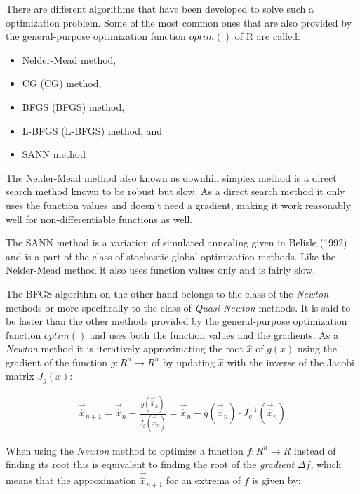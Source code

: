 There are different algorithms that have been developed to solve such a optimization problem. Some of the most common ones that are also provided by the general-purpose optimization function $optim()$  of R are called:\textsuperscript{\cite{TeamROptimization}}
\begin{itemize}
	\item Nelder-Mead method,
	\item \acl{CG} (\acs{CG}) method,
	\item \acl{BFGS} (\acs{BFGS}) method,
	\item \acl{L-BFGS} (\acs{L-BFGS}) method, and
	\item SANN method
\end{itemize}

The Nelder-Mead method also known as downhill simplex method is a direct search method known to be robust but slow. As a direct search method it only uses the function values and doesn't need a gradient, making it work reasonably well for non-differentiable functions as well.\textsuperscript{\cite{TeamROptimization}}

The SANN method is a variation of simulated annealing given in Belisle (1992)\textsuperscript{\cite{Belisle1992ConvergenceD}} and is a part of the class of stochastic global optimization methods. Like the Nelder-Mead method it also uses function values only and is fairly slow.\textsuperscript{\cite{TeamROptimization}}

The \acs{BFGS} algorithm on the other hand belongs to the class of the \textit{Newton} methods or more specifically to the class of \textit{Quasi-Newton} methods. It is said to be faster than the other methods provided by the general-purpose optimization function $optim()$ and uses both the function values and the gradients. As a \textit{Newton} method it is iteratively approximating the root $\hat{x}$ of $g(x)$ using the gradient of the function $g: R^n \rightarrow R^n$ by updating $\hat{x}$ with the inverse of the Jacobi matrix $J_g(x)$:

\begin{equation}\label{eq:newtons_method_multivariate_root}
	\begin{array}{c}
		\vec{\hat{x}}_{n+1} =\vec{\hat{x}}_{n} - \frac{g(\vec{\hat{x}}_{n})}{J_g(\vec{\hat{x}}_{n})} = \vec{\hat{x}}_{n} - g(\vec{\hat{x}}_{n}) \cdot J_g^{-1}(\vec{\hat{x}}_{n})
	\end{array}
\end{equation}

When using the \textit{Newton} method to optimize a function $f:R^n \rightarrow R$ instead of finding its root this is equivalent to finding the root of the \textit{gradient} $\Delta f$, which means that the approximation $\vec{\hat{x}}_{n+1}$ for an extrema of $f$ is given by\textsuperscript{\cite{15}}:

